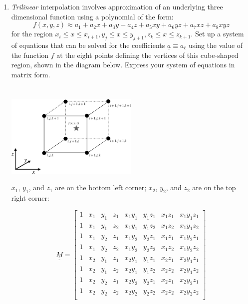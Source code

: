 \documentclass{article}
\begin{document}
\begin{enumerate}
    \pagebreak
    
    \item \emph{Trilinear} interpolation involves approximation of an underlying three dimensional function using a polynomial of the form:  
    \begin{equation}
      f(x,y,z) \approx a_1 + a_2 x + a_3 y + a_4 z + a_5 x y + a_6 y z + a_7 x z + a_8 x y z
    \end{equation}
    for the region $x_i \le x \le x_{i+1}, y_j \le x \le y_{j+1}, z_k \le x \le z_{k+1}$.  Set up a system of equations that can be solved for the coefficients $\underline{a} \equiv a_\ell$ using the value of the function $f$ at the eight points defining the vertices of this cube-shaped region, shown in the diagram below.  Express your system of equations in matrix form.  \\~\\~\\
    \includegraphics[width=0.5\textwidth]{diagram_trilinear-crop.pdf}
    
    $x_1$, $y_1$, and $z_1$ are on the bottom left corner;
    $x_2$, $y_2$, and $z_2$ are on the top right corner:
    
    $$\underline{\underline{M}} = 
     \begin{bmatrix}
    	1 & x_1 & y_1 & z_1 & x_1 y_1 & y_1 z_1 & x_1 z_1 & x_1 y_1 z_1 \\	
    	1 & x_1 & y_1 & z_2 & x_1 y_1 & y_1 z_2 & x_1 z_2 & x_1 y_1 z_2 \\
    	1 & x_1 & y_2 & z_1 & x_1 y_2 & y_2 z_1 & x_1 z_1 & x_1 y_2 z_1 \\
    	1 & x_1 & y_2 & z_2 & x_1 y_2 & y_2 z_2 & x_1 z_2 & x_1 y_2 z_2 \\
    	1 & x_2 & y_1 & z_1 & x_2 y_1 & y_1 z_1 & x_2 z_1 & x_2 y_1 z_1 \\
    	1 & x_2 & y_1 & z_2 & x_2 y_1 & y_1 z_2 & x_2 z_2 & x_2 y_1 z_2 \\
    	1 & x_2 & y_2 & z_1 & x_2 y_2 & y_2 z_1 & x_2 z_1 & x_2 y_2 z_1 \\
    	1 & x_2 & y_2 & z_2 & x_2 y_2 & y_2 z_2 & x_2 z_2 & x_2 y_2 z_2 \\
    \end{bmatrix}$$
    

\end{enumerate}
\end{document}
